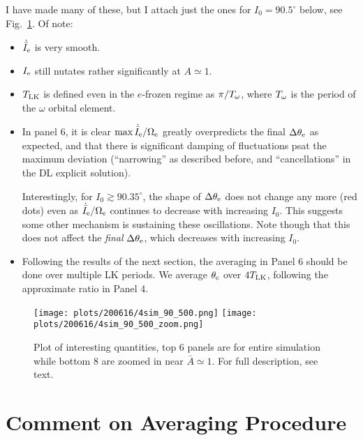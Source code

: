 \documentclass[11pt,
        usenames, %
        dvipsnames %
    ]{article}
\begin{document}
I have made many of these, but I attach just the ones for $I_0 = 90.5^\circ$
below, see Fig.~\ref{fig:plots}. Of note:
\begin{itemize}
    \item $\dot{\bar{I}}_{\rm e}$ is very smooth.

    \item $I_{\rm e}$ still nutates rather significantly at $A \simeq 1$.

    \item $T_{\rm LK}$ is defined even in the $e$-frozen regime as $\pi / T_{\rm
        \omega}$, where $T_{\rm \omega}$ is the period of the $\omega$ orbital
        element.

    \item In panel 6, it is clear $\max \dot{\bar{I}}_{\rm e} / \Omega_{\rm e}$
        greatly overpredicts the final $\Delta \theta_{\rm e}$ as expected, and
        that there is significant damping of fluctuations psat the maximum
        deviation (``narrowing'' as described before, and ``cancellations'' in
        the DL explicit solution).

        Interestingly, for $I_0 \gtrsim 90.35^\circ$, the shape of $\Delta
        \theta_{\rm e}$ does not change any more (red dots) even as
        $\dot{\bar{I}}_{\rm e} / \Omega_{\rm e}$ continues to decrease with
        increasing $I_0$. This suggests some other mechanism is sustaining these
        oscillations. Note though that this does not affect the \emph{final}
        $\Delta \theta_{\rm e}$, which decreases with increasing $I_0$.

    \item Following the results of the next section, the averaging in Panel 6
        should be done over multiple LK periods. We average $\theta_{\rm e}$
        over $4T_{\rm LK}$, following the approximate ratio in Panel 4.
\end{itemize}
\begin{figure}
    \centering
    \texttt{[image: plots/200616/4sim\_90\_500.png]}
    \texttt{[image: plots/200616/4sim\_90\_500\_zoom.png]}
    \caption{Plot of interesting quantities, top 6 panels are for entire
    simulation while bottom 8 are zoomed in near $\bar{A} \simeq 1$. For full
    description, see text.}\label{fig:plots}
\end{figure}

\section{Comment on Averaging Procedure}
\end{document}
